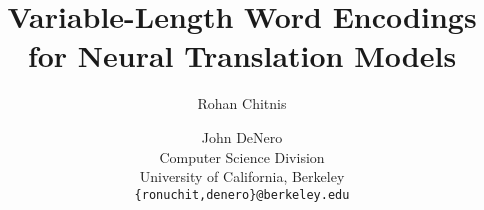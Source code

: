 \documentclass[11pt]{article}
\title{Variable-Length Word Encodings for Neural Translation Models}
\author{Rohan Chitnis \and John DeNero \\
  Computer Science Division \\
  University of California, Berkeley \\
  {\tt \{ronuchit,denero\}@berkeley.edu} \\}
\begin{document}
\maketitle
\begin{abstract}

\end{abstract}







\newpage

\end{document}
